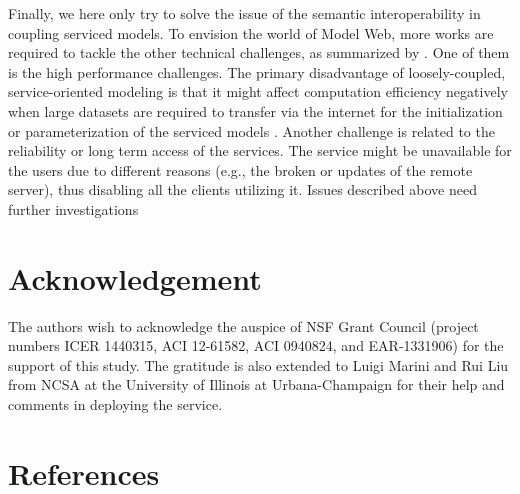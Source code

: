 \documentclass[review]{elsarticle}
\begin{document}
Finally, we here only try to solve the issue of the semantic interoperability in coupling serviced models. To envision the world of Model Web, more works are required to tackle the other technical challenges, as summarized by \cite{nativi2013}. One of them is the high performance challenges. The primary disadvantage of loosely-coupled, service-oriented modeling is that it might affect computation efficiency negatively when large datasets are required to transfer via the internet for the initialization or parameterization of the serviced models \cite{goodall2011}. Another challenge is related to the reliability or long term access of the services. The service might be unavailable for the users due to different reasons (e.g., the broken or updates of the remote server), thus disabling all the clients utilizing it. Issues described above need further investigations

\section*{Acknowledgement} The authors wish to acknowledge the auspice of NSF Grant Council (project numbers ICER 1440315, ACI 12-61582, ACI 0940824, and EAR-1331906) for the support of this study. The gratitude is also extended to Luigi Marini and Rui Liu from NCSA at the University of Illinois at Urbana-Champaign for their help and comments in deploying the service.

\section*{References}


\end{document}
